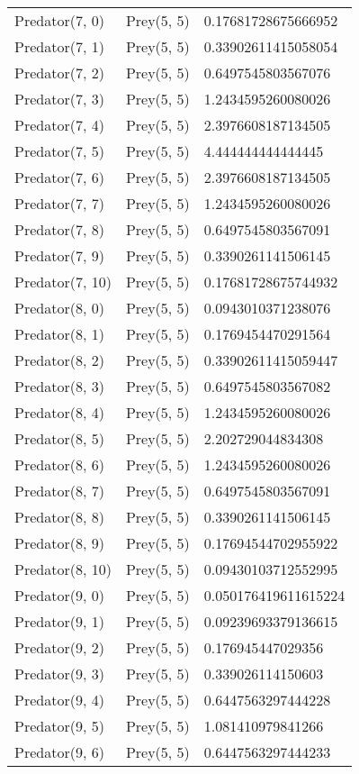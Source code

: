 \begin{longtable}{| p{} | p{} | p{} |}
Predator(7, 0) & Prey(5, 5) &0.17681728675666952\\
Predator(7, 1) & Prey(5, 5) &0.33902611415058054\\
Predator(7, 2) & Prey(5, 5) &0.6497545803567076\\
Predator(7, 3) & Prey(5, 5) &1.2434595260080026\\
Predator(7, 4) & Prey(5, 5) &2.3976608187134505\\
Predator(7, 5) & Prey(5, 5) &4.444444444444445\\
Predator(7, 6) & Prey(5, 5) &2.3976608187134505\\
Predator(7, 7) & Prey(5, 5) &1.2434595260080026\\
Predator(7, 8) & Prey(5, 5) &0.6497545803567091\\
Predator(7, 9) & Prey(5, 5) &0.3390261141506145\\
Predator(7, 10) & Prey(5, 5) &0.17681728675744932\\
Predator(8, 0) & Prey(5, 5) &0.0943010371238076\\
Predator(8, 1) & Prey(5, 5) &0.1769454470291564\\
Predator(8, 2) & Prey(5, 5) &0.33902611415059447\\
Predator(8, 3) & Prey(5, 5) &0.6497545803567082\\
Predator(8, 4) & Prey(5, 5) &1.2434595260080026\\
Predator(8, 5) & Prey(5, 5) &2.202729044834308\\
Predator(8, 6) & Prey(5, 5) &1.2434595260080026\\
Predator(8, 7) & Prey(5, 5) &0.6497545803567091\\
Predator(8, 8) & Prey(5, 5) &0.3390261141506145\\
Predator(8, 9) & Prey(5, 5) &0.17694544702955922\\
Predator(8, 10) & Prey(5, 5) &0.09430103712552995\\
Predator(9, 0) & Prey(5, 5) &0.050176419611615224\\
Predator(9, 1) & Prey(5, 5) &0.09239693379136615\\
Predator(9, 2) & Prey(5, 5) &0.176945447029356\\
Predator(9, 3) & Prey(5, 5) &0.339026114150603\\
Predator(9, 4) & Prey(5, 5) &0.6447563297444228\\
Predator(9, 5) & Prey(5, 5) &1.081410979841266\\
Predator(9, 6) & Prey(5, 5) &0.6447563297444233\\

\end{longtable}
